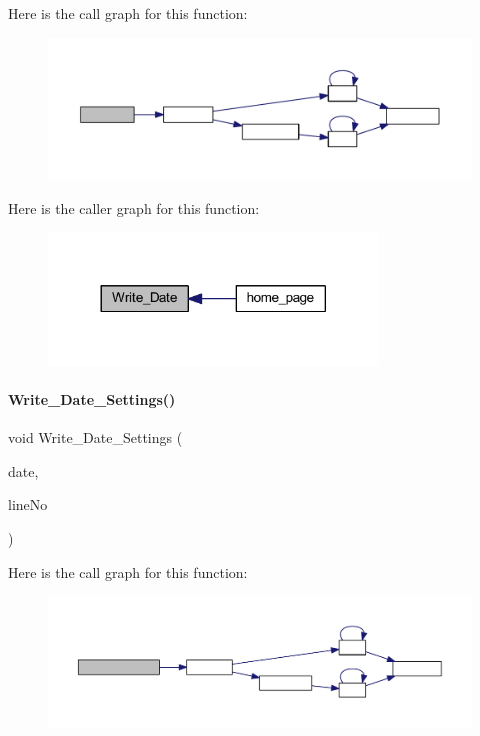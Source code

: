 Here is the call graph for this function\+:
\nopagebreak
\begin{figure}[H]
\begin{center}
\leavevmode
\includegraphics[width=350pt]{a00032_a897e97006c9f0d112306aac62288d408_cgraph}
\end{center}
\end{figure}
Here is the caller graph for this function\+:
\nopagebreak
\begin{figure}[H]
\begin{center}
\leavevmode
\includegraphics[width=248pt]{a00032_a897e97006c9f0d112306aac62288d408_icgraph}
\end{center}
\end{figure}
\mbox{\label{a00032_a754f53f3cd8f30c8c0211fdb4f548a31}} 
\paragraph{Write\+\_\+\+Date\+\_\+\+Settings()}
{\footnotesize\ttfamily void Write\+\_\+\+Date\+\_\+\+Settings (\begin{DoxyParamCaption}\item[{\textbf{ Date\+Time}}]{date,  }\item[{int}]{line\+No }\end{DoxyParamCaption})}

Here is the call graph for this function\+:
\nopagebreak
\begin{figure}[H]
\begin{center}
\leavevmode
\includegraphics[width=350pt]{a00032_a754f53f3cd8f30c8c0211fdb4f548a31_cgraph}
\end{center}
\end{figure}
\mbox{\label{a00032_a7a79900a1e7306db896b33ca4a068108}} 
